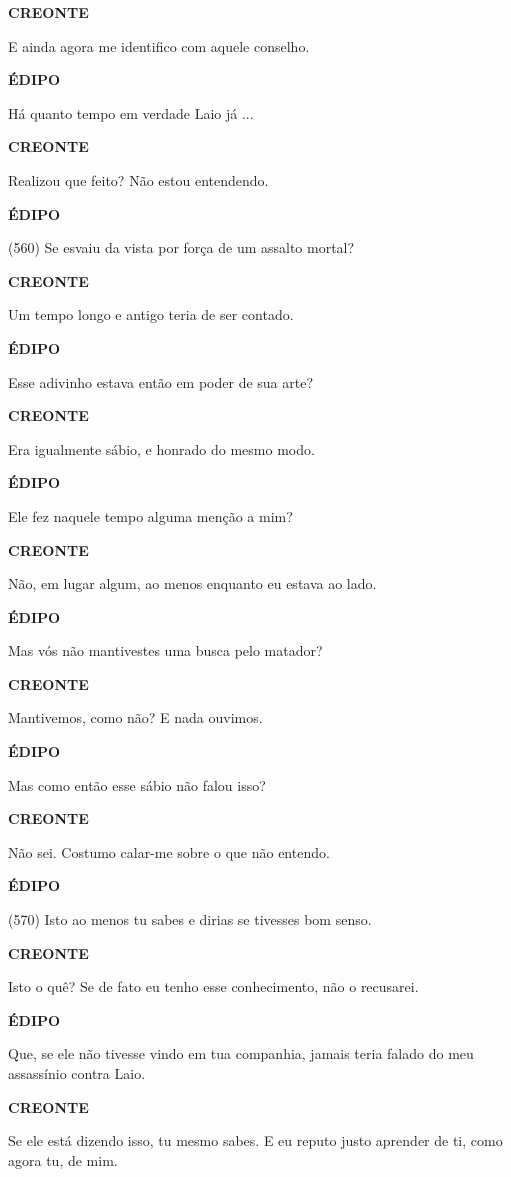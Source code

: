 \textbf{CREONTE}

E ainda agora me identifico com aquele conselho.

\textbf{ÉDIPO}

Há quanto tempo em verdade Laio já ...

\textbf{CREONTE}

Realizou que feito? Não estou entendendo.

\textbf{ÉDIPO}

(560) Se esvaiu da vista por força de um assalto mortal?

\textbf{CREONTE}

Um tempo longo e antigo teria de ser contado.

\textbf{ÉDIPO}

Esse adivinho estava então em poder de sua arte?

\textbf{CREONTE}

Era igualmente sábio, e honrado do mesmo modo.

\textbf{ÉDIPO}

Ele fez naquele tempo alguma menção a mim?

\textbf{CREONTE}

Não, em lugar algum, ao menos enquanto eu estava ao lado.

\textbf{ÉDIPO}

Mas vós não mantivestes uma busca pelo matador?

\textbf{CREONTE}

Mantivemos, como não? E nada ouvimos.

\textbf{ÉDIPO}

Mas como então esse sábio não falou isso?

\textbf{CREONTE}

Não sei. Costumo calar-me sobre o que não entendo.

\textbf{ÉDIPO}

(570) Isto ao menos tu sabes e dirias se tivesses bom senso.

\textbf{CREONTE}

Isto o quê? Se de fato eu tenho esse conhecimento, não o recusarei.

\textbf{ÉDIPO}

Que, se ele não tivesse vindo em tua companhia, jamais teria falado do
meu assassínio contra Laio.

\textbf{CREONTE}

Se ele está dizendo isso, tu mesmo sabes. E eu reputo justo aprender de
ti, como agora tu, de mim.

